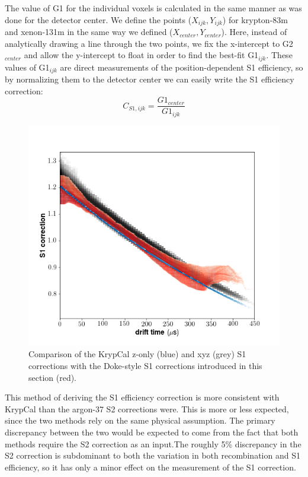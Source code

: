 The value of G1 for the individual voxels is calculated in the same manner as was done for the detector center. We define the points ($X_{ijk},Y_{ijk}$) for krypton-83m and xenon-131m in the same way we defined ($X_{center},Y_{center}$). Here, instead of analytically drawing a line through the two points, we fix the x-intercept to G2$_{center}$ and allow the y-intercept to float in order to find the best-fit G1$_{ijk}$. These values of G1$_{ijk}$ are direct measurements of the position-dependent S1 efficiency, so by normalizing them to the detector center we can easily write the S1 efficiency correction:
\begin{equation}
C_{S1,ijk}=\frac{G1_{center}}{G1_{ijk}}
\end{equation}
\begin{figure}[h!]
\centering
\includegraphics[width=150mm]{Figures/S1corr_dt.png}
\caption{Comparison of the KrypCal z-only (blue) and xyz (grey) S1 corrections with the Doke-style S1 corrections introduced in this section (red). }
\label{fig:S1corr_dt} 
\end{figure}

This method of deriving the S1 efficiency correction is more consistent with KrypCal than the argon-37 S2 corrections were. This is more or less expected, since the two methods rely on the same physical assumption. The primary discrepancy between the two would be expected to come from the fact that both methods require the S2 correction as an input.The roughly 5\% discrepancy in the S2 correction is subdominant to both the variation in both recombination and S1 efficiency, so it has only a minor effect on the measurement of the S1 correction.  


